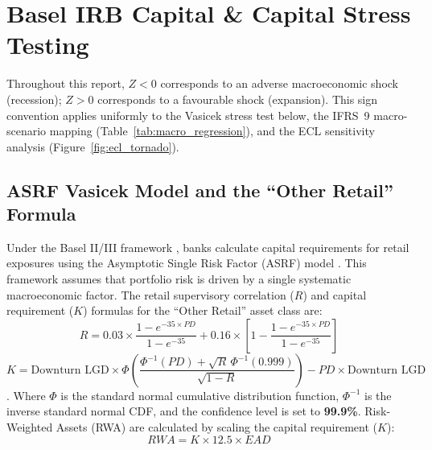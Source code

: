 \documentclass[11pt,a4paper]{article}
\begin{document}
\section{Basel IRB Capital \& Capital Stress Testing}

Throughout this report, $Z < 0$ corresponds to an adverse macroeconomic shock (recession); $Z > 0$ corresponds to a favourable shock (expansion). This sign convention applies uniformly to the Vasicek stress test below, the IFRS~9 macro-scenario mapping (Table~\ref{tab:macro_regression}), and the ECL sensitivity analysis (Figure~\ref{fig:ecl_tornado}).

\subsection{ASRF Vasicek Model and the ``Other Retail'' Formula}
Under the Basel II/III framework \parencite{bcbs2004}, banks calculate capital requirements for retail exposures using the Asymptotic Single Risk Factor (ASRF) model \parencite{vasicek2002}. This framework assumes that portfolio risk is driven by a single systematic macroeconomic factor. The retail supervisory correlation ($R$) and capital requirement ($K$) formulas for the ``Other Retail'' asset class are:
\begin{equation}
R = 0.03 \times \frac{1 - e^{-35 \times PD}}{1 - e^{-35}} + 0.16 \times \left[ 1 - \frac{1 - e^{-35 \times PD}}{1 - e^{-35}} \right]
\end{equation}
\begin{equation}
K = \text{Downturn LGD} \times \Phi\!\left( \frac{\Phi^{-1}(PD) + \sqrt{R}\,\Phi^{-1}(0.999)}{\sqrt{1 - R}} \right) - PD \times \text{Downturn LGD}
\end{equation}
\parencite[§328]{bcbs2004}. Where $\Phi$ is the standard normal cumulative distribution function, $\Phi^{-1}$ is the inverse standard normal CDF, and the confidence level is set to \textbf{99.9\%}. Risk-Weighted Assets (RWA) are calculated by scaling the capital requirement ($K$):
\begin{equation}
RWA = K \times 12.5 \times EAD
\end{equation}
\end{document}
